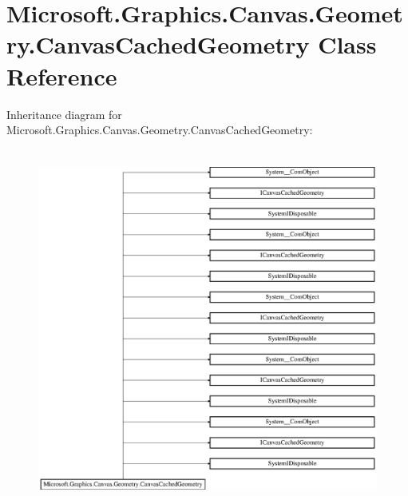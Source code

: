 \hypertarget{class_microsoft_1_1_graphics_1_1_canvas_1_1_geometry_1_1_canvas_cached_geometry}{}\section{Microsoft.\+Graphics.\+Canvas.\+Geometry.\+Canvas\+Cached\+Geometry Class Reference}
\label{class_microsoft_1_1_graphics_1_1_canvas_1_1_geometry_1_1_canvas_cached_geometry}
Inheritance diagram for Microsoft.\+Graphics.\+Canvas.\+Geometry.\+Canvas\+Cached\+Geometry\+:\begin{figure}[H]
\begin{center}
\leavevmode
\includegraphics[height=11.851852cm]{class_microsoft_1_1_graphics_1_1_canvas_1_1_geometry_1_1_canvas_cached_geometry}
\end{center}
\end{figure}
